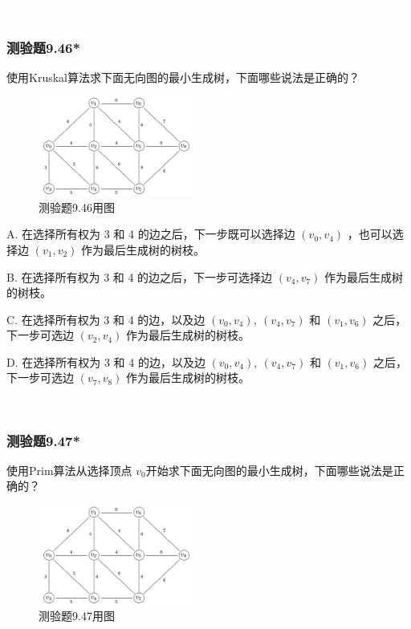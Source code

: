 \documentclass[UTF8, heading=true]{ctexart}
\begin{document}
\textcolor{white}{答案：(1) $19 / a$
(2) $16 / d$
(3) $16 / d$
(4) $21 / e$
(5) $18 / b$
(6) $18 / b$}

\subsubsection{测验题9.46*}

使用Kruskal算法求下面无向图的最小生成树，下面哪些说法是正确的？

\begin{figure}[H]
  \centering
  \includegraphics[width=0.45\textwidth]{9.46.jpg} %
  \caption{测验题9.46用图}
\end{figure}

A. 在选择所有权为 3 和 4 的边之后，下一步既可以选择边 $\left(v_0, v_4\right)$ ，也可以选择边 $\left(v_1, v_2\right)$ 作为最后生成树的树枝。

B. 在选择所有权为 3 和 4 的边之后，下一步可选择边 $\left(v_4, v_7\right)$ 作为最后生成树的树枝。

C. 在选择所有权为 3 和 4 的边，以及边 $\left(v_0, v_4\right), ~\left(v_4, v_7\right)$ 和 $\left(v_1, v_6\right)$ 之后，下一步可选边 $\left(v_2, v_4\right)$ 作为最后生成树的树枝。

D. 在选择所有权为 3 和 4 的边，以及边 $\left(v_0, v_4\right), ~\left(v_4, v_7\right)$ 和 $\left(v_1, v_6\right)$ 之后，下一步可选边 $\left(v_7, v_8\right)$ 作为最后生成树的树枝。

\textcolor{white}{答案：BD}

\subsubsection{测验题9.47*}

使用Prim算法从选择顶点 $v_0$开始求下面无向图的最小生成树，下面哪些说法是正确的？

\begin{figure}[H]
  \centering
  \includegraphics[width=0.45\textwidth]{9.46.jpg} %
  \caption{测验题9.47用图}
\end{figure}
\end{document}
